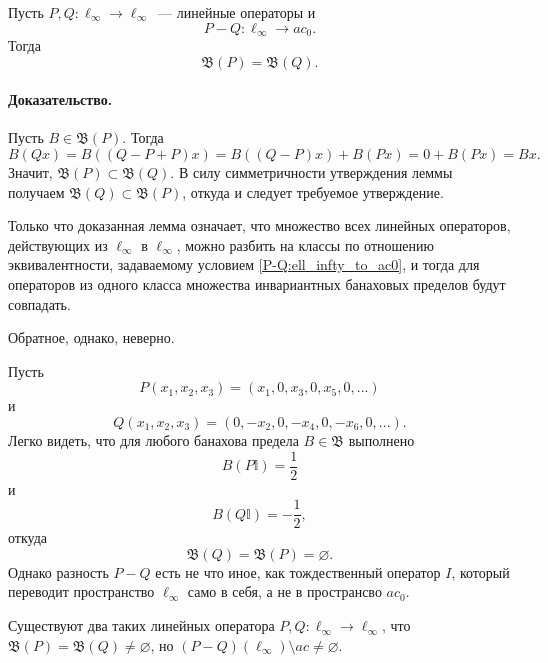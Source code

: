 \begin{lemma}
	Пусть $P,Q:\ell_\infty \to \ell_\infty$~--- линейные операторы и
	\begin{equation}\label{P-Q:ell_infty_to_ac0}
		P-Q : \ell_\infty \to ac_0
		.
	\end{equation}
	Тогда
	\begin{equation}
		\mathfrak{B}(P)=\mathfrak{B}(Q)
		.
	\end{equation}
\end{lemma}

\paragraph{Доказательство.}
Пусть $B\in \mathfrak{B}(P)$.
Тогда
\begin{equation}
	B(Qx) = B((Q-P+P)x) =
	B((Q-P)x)+B(Px) =
	0 + B(Px) =
	Bx
	.
\end{equation}
Значит, $\mathfrak{B}(P) \subset \mathfrak{B}(Q)$.
В силу симметричности утверждения леммы получаем $\mathfrak{B}(Q) \subset \mathfrak{B}(P)$,
откуда и следует требуемое утверждение.

Только что доказанная лемма означает, что множество всех линейных операторов,
действующих из $\ell_\infty$ в $\ell_\infty$, можно разбить на классы по отношению эквивалентности,
задаваемому условием \eqref{P-Q:ell_infty_to_ac0},
и тогда для операторов из одного класса множества инвариантных банаховых пределов будут совпадать.

Обратное, однако, неверно.

\begin{example}
	Пусть
	\begin{equation}
		P(x_1,x_2,x_3) = (x_1, 0, x_3, 0, x_5, 0, ...)
	\end{equation}
	и
	\begin{equation}
		Q(x_1,x_2,x_3) = (0, -x_2, 0, -x_4, 0, -x_6, 0, ...)
		.
	\end{equation}
	Легко видеть, что для любого банахова предела $B\in\mathfrak{B}$ выполнено
	\begin{equation}
		B(P\mathbb{I}) = \frac{1}{2}
	\end{equation}
	и
	\begin{equation}
		B(Q\mathbb{I}) = -\frac{1}{2}
		,
	\end{equation}
	откуда
	\begin{equation}
		\mathfrak{B}(Q) = \mathfrak{B}(P) = \varnothing
		.
	\end{equation}
	Однако разность $P-Q$ есть не что иное, как тождественный оператор $I$,
	который переводит пространство $\ell_\infty$ само в себя,
	а не в пространсво $ac_0$.
\end{example}


\begin{hypothesis}
	Существуют два таких линейных оператора $P, Q : \ell_\infty \to \ell_\infty$,
	что $\mathfrak{B}(P) = \mathfrak{B}(Q) \neq \varnothing$,
	но $(P-Q)(\ell_\infty) \setminus ac \neq \varnothing$.
\end{hypothesis}

